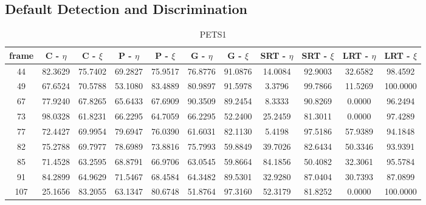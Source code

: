 \clearpage
\begin{appendices}



\chapter{Default Detection and Discrimination}

\begin{table}
\centering
\caption{PETS1}
\begin{tabular}{ |c|c|c|c|c|c|c|c|c|c|c| }
	\hline
\textbf{frame} &  \textbf{C - $\eta$} &  \textbf{C - $\xi$} &  \textbf{P - $\eta$} &  \textbf{P - $\xi$} &  \textbf{G - $\eta$} &  \textbf{G - $\xi$} &  \textbf{SRT - $\eta$} &  \textbf{SRT - $\xi$} &  \textbf{LRT - $\eta$} &  \textbf{LRT - $\xi$} \\
\hline
\hline
44 & 82.3629 &  75.7402 &   69.2827 &  75.9517 &   76.8776 &  91.0876 &   14.0084 &  92.9003 &   32.6582 &  98.4592 \\
\hline
49 & 67.6524 &  70.5788 &   53.1080 &  83.4889 &   80.9897 &  91.5978 &   3.3796 &  99.7866 &   11.5269 &  100.0000 \\
\hline
67 & 77.9240 &  67.8265 &   65.6433 &  67.6909 &   90.3509 &  89.2454 &   8.3333 &  90.8269 &   0.0000 &  96.2494 \\
\hline
73 & 98.0328 &  61.8231 &   66.2295 &  64.7059 &   66.2295 &  52.2400 &   25.2459 &  81.3011 &   0.0000 &  97.4289 \\
\hline
77 & 72.4427 &  69.9954 &   79.6947 &  76.0390 &   61.6031 &  82.1130 &   5.4198 &  97.5186 &   57.9389 &  94.1848 \\
\hline
82 & 75.2788 &  69.7977 &   78.6989 &  73.8816 &   75.7993 &  59.8849 &   39.7026 &  82.6434 &   50.3346 &  93.9391 \\
\hline
85 & 71.4528 &  63.2595 &   68.8791 &  66.9706 &   63.0545 &  59.8664 &   84.1856 &  50.4082 &   32.3061 &  95.5784 \\
\hline
91 & 84.2899 &  64.9629 &   71.5467 &  68.4584 &   64.3482 &  89.5301 &   32.9280 &  87.0404 &   30.7393 &  87.0899 \\
\hline
107 & 25.1656 &  83.2055 &   63.1347 &  80.6748 &   51.8764 &  97.3160 &   52.3179 &  81.8252 &   0.0000 &  100.0000 \\

\end{tabular}
\end{table}
\end{appendices}
